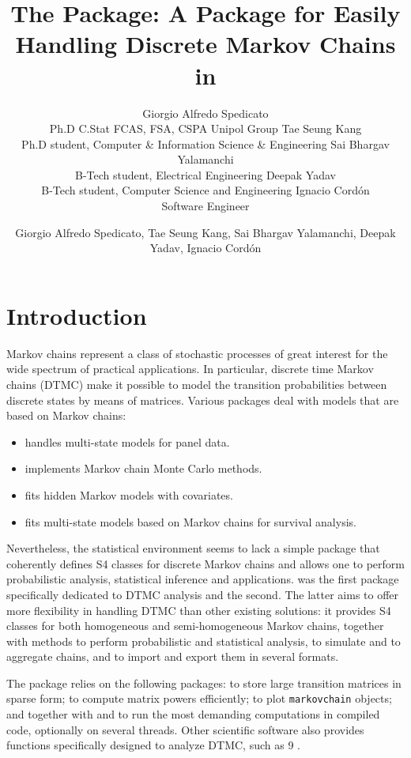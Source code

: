 \documentclass[
  nojss]{jss}
\author{
Giorgio Alfredo Spedicato\\Ph.D C.Stat FCAS, FSA, CSPA Unipol Group \And Tae Seung Kang\\Ph.D student, Computer \& Information Science \& Engineering \And Sai Bhargav Yalamanchi\\B-Tech student, Electrical Engineering \And Deepak Yadav\\B-Tech student, Computer Science and Engineering \And Ignacio Cordón\\Software Engineer
}
\title{The \pkg{markovchain} Package: A Package for Easily Handling Discrete Markov Chains in \proglang{R}}
\author{\small{Giorgio Alfredo Spedicato, Tae Seung Kang, Sai Bhargav Yalamanchi, Deepak Yadav, Ignacio Cordón}}
\providecommand{\tightlist}{%
  \setlength{\itemsep}{0pt}\setlength{\parskip}{0pt}}
\begin{document}
\section{Introduction}\label{introduction}

Markov chains represent a class of stochastic processes of great interest for the wide spectrum of practical applications. In particular, discrete time Markov chains (DTMC) make it possible to model the transition probabilities between discrete states by means of matrices. Various  packages deal with models that are based on Markov chains:

\begin{itemize}
\tightlist
\item
   \citep{msmR} handles multi-state models for panel data.
\item
   \citep{mcmcR} implements Markov chain Monte Carlo methods.
\item
   \citep{hmmR} fits hidden Markov models with covariates.
\item
   \citep{mstateR} fits multi-state models based on Markov chains for survival analysis.
\end{itemize}

Nevertheless, the  statistical environment \citep{rSoftware} seems to lack a simple package that coherently defines S4 classes for discrete Markov chains and allows one to perform probabilistic analysis, statistical inference and applications.  \citep{DTMCPackR} was the first package specifically dedicated to DTMC analysis and  \citep{pkg:markovchain} the second. The latter aims to offer more flexibility in handling DTMC than other existing solutions: it provides S4 classes for both homogeneous and semi-homogeneous Markov chains, together with methods to perform probabilistic and statistical analysis, to simulate and to aggregate chains, and to import and export them in several formats.

The  package relies on the following  packages:  to store large transition matrices in sparse form;  \citep{expmR} to compute matrix powers efficiently;  \citep{pkg:igraph} to plot \texttt{markovchain} objects; and  \citep{RcppR} together with  and  to run the most demanding computations in compiled  code, optionally on several threads. Other scientific software also provides functions specifically designed to analyze DTMC, such as  9 \citep{mathematica9}.
\end{document}
